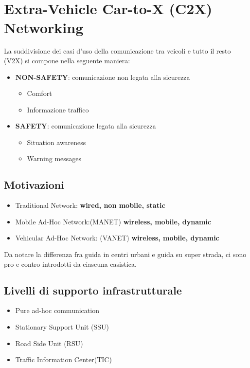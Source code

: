 \section{Extra-Vehicle Car-to-X (C2X) Networking}

La suddivisione dei casi d'uso della comunicazione tra veicoli e tutto il resto (V2X) si compone
nella seguente maniera:

\begin{itemize}
	\item \textbf{NON-SAFETY}: comunicazione non legata alla sicurezza
	      \begin{itemize}
		      \item Comfort
		      \item Informazione traffico
	      \end{itemize}
	\item \textbf{SAFETY}: comunicazione legata alla sicurezza
	      \begin{itemize}
		      \item Situation awareness
		      \item Warning messages
	      \end{itemize}
\end{itemize}



\subsection{Motivazioni}

\begin{itemize}
	\item Traditional Network: \textbf{wired, non mobile, static}
	\item Mobile Ad-Hoc Network:(MANET) \textbf{wireless, mobile, dynamic}
	\item Vehicular Ad-Hoc Network: (VANET) \textbf{wireless, mobile, dynamic}
\end{itemize}

Da notare la differenza fra guida in centri urbani e guida su super strada, ci sono pro e contro
introdotti da ciascuna casistica.


\subsection{Livelli di supporto infrastrutturale}

\begin{itemize}
	\item Pure ad-hoc communication
	\item Stationary Support Unit (SSU)
	\item Road Side Unit (RSU)
	\item Traffic Information Center(TIC)
\end{itemize}

